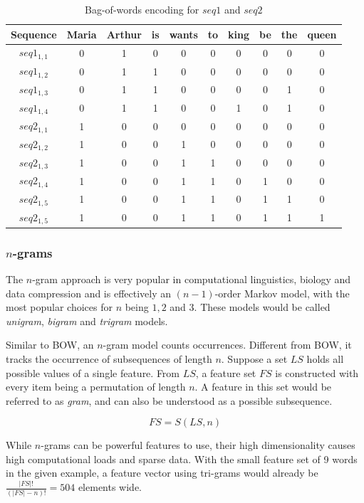 \begin{table}
    \centering
    \begin{tabular}{c|ccccccccc}
        Sequence & Maria & Arthur & is & wants & to & king & be & the & queen\\
        \midrule
        $seq1_{1,1}$ & 0 & 1 & 0 & 0 & 0 & 0 & 0 & 0 & 0\\
        $seq1_{1,2}$ & 0 & 1 & 1 & 0 & 0 & 0 & 0 & 0 & 0\\
        $seq1_{1,3}$ & 0 & 1 & 1 & 0 & 0 & 0 & 0 & 1 & 0\\
        $seq1_{1,4}$ & 0 & 1 & 1 & 0 & 0 & 1 & 0 & 1 & 0\\
        \hline
        $seq2_{1,1}$ & 1 & 0 & 0 & 0 & 0 & 0 & 0 & 0 & 0\\
        $seq2_{1,2}$ & 1 & 0 & 0 & 1 & 0 & 0 & 0 & 0 & 0\\
        $seq2_{1,3}$ & 1 & 0 & 0 & 1 & 1 & 0 & 0 & 0 & 0\\
        $seq2_{1,4}$ & 1 & 0 & 0 & 1 & 1 & 0 & 1 & 0 & 0\\
        $seq2_{1,5}$ & 1 & 0 & 0 & 1 & 1 & 0 & 1 & 1 & 0\\
        $seq2_{1,5}$ & 1 & 0 & 0 & 1 & 1 & 0 & 1 & 1 & 1\\
    \end{tabular}
    \caption{Bag-of-words encoding for $seq1$ and $seq2$}
    \label{tab:bow-encoding}
\end{table}
\subsubsection*{$n$-grams}
The $n$-gram approach is very popular in computational linguistics, biology and data compression and is effectively an $(n-1)$-order Markov model, with the most popular choices for $n$ being $1,2$ and $3$. These models would be called \textit{unigram}, \textit{bigram} and \textit{trigram} models.

Similar to BOW, an $n$-gram model counts occurrences. Different from BOW, it tracks the occurrence of subsequences of length $n$. Suppose a set $LS$ holds all possible values of a single feature. From $LS$, a feature set $FS$ is constructed with every item being a permutation of length $n$. A feature in this set would be referred to as \textit{gram}, and can also be understood as a possible subsequence.

$$
FS = S(LS, n)
$$

While $n$-grams can be powerful features to use, their high dimensionality causes high computational loads and sparse data. With the small feature set of 9 words in the given example, a feature vector using tri-grams would already be $\frac{|FS|!}{(|FS|-n)!}=504$ elements wide.

